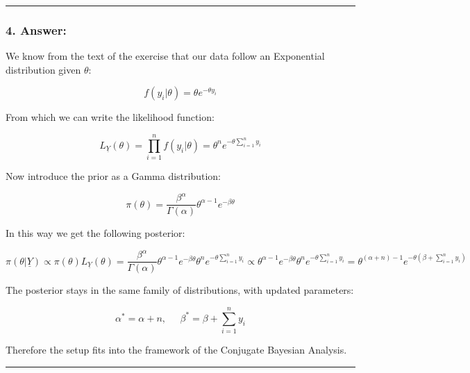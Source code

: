 \documentclass[
]{article}
\begin{document}
\begin{center}\rule{0.5\linewidth}{0.5pt}\end{center}

\hypertarget{answer-7}{%
\subsubsection{4. Answer:}\label{answer-7}}

We know from the text of the exercise that our data follow an
Exponential distribution given \(\theta\):

\[
f(y_i|\theta) = \theta e^{-\theta y_i}
\]

From which we can write the likelihood function:

\[
L_{\underline{Y}}(\theta) =
\prod_{i=1}^{n}f(y_i | \theta) =
\theta^n e^{-\theta \sum_{i=1}^{n} y_i}
\]

Now introduce the prior as a Gamma distribution:

\[
\pi(\theta) =
\frac{\beta^{\alpha}}{\Gamma(\alpha)} \theta^{\alpha-1}e^{-\beta \theta}
\]

In this way we get the following posterior:

\[
\pi(\theta|\underline{Y}) \propto
\pi(\theta)L_{\underline{Y}}(\theta) =
\frac{\beta^{\alpha}}{\Gamma(\alpha)} \theta^{\alpha-1}e^{-\beta \theta} \theta^n e^{-\theta \sum_{i=1}^{n} y_i} \propto
\theta^{\alpha-1} e^{-\beta\theta} \theta^n e^{-\theta \sum_{i=1}^{n} y_i} = \theta^{(\alpha + n) - 1} e^{-\theta(\beta + \sum_{i=1}^{n} y_i)}
\]

The posterior stays in the same family of distributions, with updated
parameters:

\[
\alpha^* = \alpha + n, \;\;\;\;\; \beta^* = \beta + \sum_{i=1}^{n} y_i
\]

Therefore the setup fits into the framework of the Conjugate Bayesian
Analysis.

\begin{center}\rule{0.5\linewidth}{0.5pt}\end{center}
\end{document}
